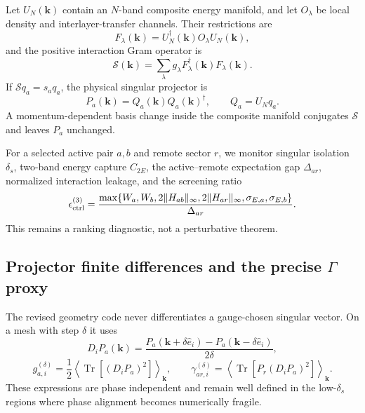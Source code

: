 \documentclass[11pt]{article}
\theoremstyle{remark}
\newcommand{\Tr}{\operatorname{Tr}}
\newcommand{\cS}{\mathcal S}
\newcommand{\bmk}{\bm k}
\begin{document}
Let $U_N(\bmk)$ contain an $N$-band composite energy manifold, and let $O_\lambda$ be local density and interlayer-transfer channels.  Their restrictions are
\begin{equation}
 F_\lambda(\bmk)=U_N^\dagger(\bmk)O_\lambda U_N(\bmk),
\end{equation}
and the positive interaction Gram operator is
\begin{equation}
 \boxed{\cS(\bmk)=\sum_\lambda g_\lambda
 F_\lambda^\dagger(\bmk)F_\lambda(\bmk).}
 \label{eq:material-interaction-Gram}
\end{equation}
If $\cS q_a=s_aq_a$, the physical singular projector is
\begin{equation}
 P_a(\bmk)=Q_a(\bmk)Q_a(\bmk)^\dagger,
 \qquad Q_a=U_Nq_a.
\end{equation}
A momentum-dependent basis change inside the composite manifold conjugates $\cS$ and leaves $P_a$ unchanged.

For a selected active pair $a,b$ and remote sector $r$, we monitor singular isolation $\delta_s$, two-band energy capture $C_{2E}$, the active--remote expectation gap $\Delta_{ar}$, normalized interaction leakage, and the screening ratio
\begin{equation}
 \epsilon_{\rm ctrl}^{(3)}=
 \frac{\max\{W_a,W_b,2\|H_{ab}\|_\infty,2\|H_{ar}\|_\infty,
 \sigma_{E,a},\sigma_{E,b}\}}{\Delta_{ar}}.
 \label{eq:threeband-control}
\end{equation}
This remains a ranking diagnostic, not a perturbative theorem.

\subsection{Projector finite differences and the precise \texorpdfstring{$\Gamma$}{Gamma} proxy}

The revised geometry code never differentiates a gauge-chosen singular vector.  On a mesh with step $\delta$ it uses
\begin{equation}
 D_iP_a(\bmk)=
 \frac{P_a(\bmk+\delta\hat e_i)-P_a(\bmk-\delta\hat e_i)}{2\delta},
 \label{eq:projector-difference}
\end{equation}
\begin{equation}
 g_{a,i}^{(\delta)}=\frac12\left\langle\Tr[(D_iP_a)^2]\right\rangle_{\bmk},
 \qquad
 \gamma_{ar,i}^{(\delta)}=
 \left\langle\Tr[P_r(D_iP_a)^2]\right\rangle_{\bmk}.
 \label{eq:projector-geometry}
\end{equation}
These expressions are phase independent and remain well defined in the low-$\delta_s$ regions where phase alignment becomes numerically fragile.
\end{document}

